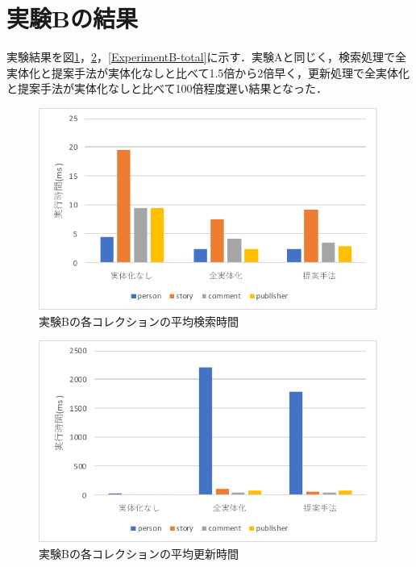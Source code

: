 \documentclass[a4paper,11pt]{ujreport}
\begin{document}
\section{実験Bの結果}
実験結果を図\ref{ExperimentB-find}，\ref{ExperimentB-update}，\ref{ExperimentB-total}に示す．実験Aと同じく，検索処理で全実体化と提案手法が実体化なしと比べて1.5倍から2倍早く，更新処理で全実体化と提案手法が実体化なしと比べて100倍程度遅い結果となった．
\begin{figure}[htbp]
	\begin{center}
		\includegraphics[width=30em]{src/ExperimentB-find.pdf} %
	\end{center}
	\caption{実験Bの各コレクションの平均検索時間}
	\label{ExperimentB-find}
\end{figure}
\begin{figure}[htbp]
	\begin{center}
		\includegraphics[width=30em]{src/ExperimentB-update.pdf} %
	\end{center}
	\caption{実験Bの各コレクションの平均更新時間}
	\label{ExperimentB-update}
\end{figure}
\end{document}
